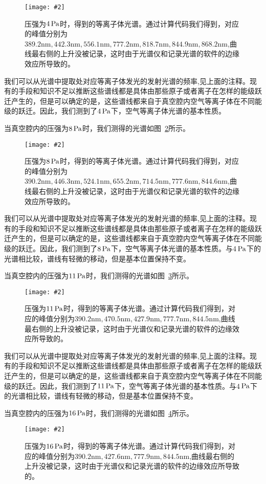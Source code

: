 \documentclass{ctexart}
\newcommand{\cpic}[2]{
\begin{center}
\texttt{[image: \#2]}
\end{center}
}
\newcommand{\cpicn}[3]
{
\begin{figure}[H]
\cpic{#1}{#2}
\caption{#3\label{#2}}
\end{figure}
}
\begin{document}
\cpicn{0.35}{4.png}{\color{red} 压强为$4\,\mathrm{Pa}$时，得到的等离子体光谱。通过计算代码我们得到，对应的峰值分别为$389.2\mathrm{nm},442.3\mathrm{nm},556.1\mathrm{nm},777.2\mathrm{nm},818.7\mathrm{nm},844.9\mathrm{nm},868.2\mathrm{nm}$,曲线最右侧的上升没被记录，这时由于光谱仪和记录光谱的软件的边缘效应所导致的。}

我们可以从光谱中提取处对应等离子体发光的发射光谱的频率,见上面的注释。现有的手段和知识不足以推断这些谱线都是具体由那些原子或者离子在怎样的能级跃迁产生的，但是可以确定的是，这些谱线都来自于真空腔内空气等离子体在不同能级的跃迁。因此，我们测到了$4\,\mathrm{Pa}$下，空气等离子体光谱的基本性质。


当真空腔内的压强为$8\,\mathrm{Pa}$时，我们测得的光谱如图~\ref{8}所示。

\cpicn{0.5}{8}{\color{red} 压强为$8\,\mathrm{Pa}$时，得到的等离子体光谱。通过计算代码我们得到，对应的峰值分别为$390.2\mathrm{nm},446.3\mathrm{nm},524.1\mathrm{nm},655.2\mathrm{nm},714.5\mathrm{nm},777.6\mathrm{nm},844.6\mathrm{nm}$,曲线最右侧的上升没被记录，这时由于光谱仪和记录光谱的软件的边缘效应所导致的。}

我们可以从光谱中提取处对应等离子体发光的发射光谱的频率,见上面的注释。现有的手段和知识不足以推断这些谱线都是具体由那些原子或者离子在怎样的能级跃迁产生的，但是可以确定的是，这些谱线都来自于真空腔内空气等离子体在不同能级的跃迁。因此，我们测到了$8\,\mathrm{Pa}$下，空气等离子体光谱的基本性质。与4$\,\mathrm{Pa}$下的光谱相比较，{\color{red}谱线有轻微的移动，但是基本位置保持不变。}

当真空腔内的压强为$11\,\mathrm{Pa}$时，我们测得的光谱如图~\ref{11}所示。

\cpicn{0.5}{11}{\color{red} 压强为$11\,\mathrm{Pa}$时，得到的等离子体光谱。通过计算代码我们得到，对应的峰值分别为$390.2\mathrm{nm},470.5\mathrm{nm},427.9\mathrm{nm},777.7\mathrm{nm},844.5\mathrm{nm}$,曲线最右侧的上升没被记录，这时由于光谱仪和记录光谱的软件的边缘效应所导致的。}

我们可以从光谱中提取处对应等离子体发光的发射光谱的频率,见上面的注释。现有的手段和知识不足以推断这些谱线都是具体由那些原子或者离子在怎样的能级跃迁产生的，但是可以确定的是，这些谱线都来自于真空腔内空气等离子体在不同能级的跃迁。因此，我们测到了$11\,\mathrm{Pa}$下，空气等离子体光谱的基本性质。与4$\,\mathrm{Pa}$下的光谱相比较，{\color{red}谱线有轻微的移动，但是基本位置保持不变。}

当真空腔内的压强为$16\,\mathrm{Pa}$时，我们测得的光谱如图~\ref{16}所示。

\cpicn{0.5}{16}{\color{red} 压强为$16\,\mathrm{Pa}$时，得到的等离子体光谱。通过计算代码我们得到，对应的峰值分别为$390.2\mathrm{nm},427.6\mathrm{nm},777.9\mathrm{nm},844.5\mathrm{nm}$,曲线最右侧的上升没被记录，这时由于光谱仪和记录光谱的软件的边缘效应所导致的。}
\end{document}
